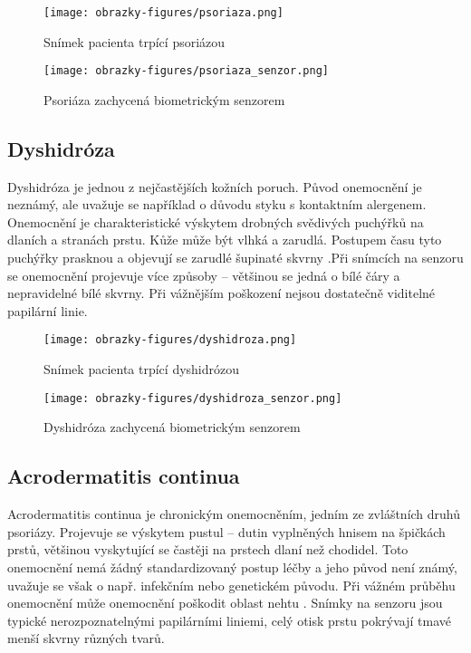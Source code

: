 \begin{figure}[!htbp]
  \begin{minipage}[b]{0.5\linewidth}
    \centering
    \texttt{[image: obrazky-figures/psoriaza.png]}
    \caption{Snímek pacienta trpící psoriázou~\cite{InfluenceSkinDiseases}}
  \end{minipage}
  \hspace{0.5cm}
  \begin{minipage}[b]{0.5\linewidth}
    \centering
    \texttt{[image: obrazky-figures/psoriaza\_senzor.png]}
    \caption{Psoriáza zachycená biometrickým senzorem \cite{Barotova}}
  \end{minipage}
\end{figure}
\subsection*{Dyshidróza}
Dyshidróza je jednou z nejčastějších kožních poruch. Původ onemocnění je neznámý, ale uvažuje se například o důvodu styku s kontaktním alergenem. Onemocnění je charakteristické výskytem drobných svědivých puchýřků na dlaních a stranách prstu. Kůže může být vlhká a zarudlá. Postupem času tyto puchýřky prasknou a objevují se zarudlé šupinaté skvrny \cite{InfluenceSkinDiseases}.Při snímcích na senzoru se onemocnění projevuje více způsoby -- většinou se jedná o bílé čáry a nepravidelné bílé skvrny. Při vážnějším poškození nejsou dostatečně viditelné papilární linie.

\begin{figure}[!htbp]
  \begin{minipage}[b]{0.5\linewidth}
    \centering
    \texttt{[image: obrazky-figures/dyshidroza.png]}
    \caption{Snímek pacienta trpící dyshidrózou \cite{InfluenceSkinDiseases}}
  \end{minipage}
  \hspace{0.5cm}
  \begin{minipage}[b]{0.5\linewidth}
    \centering
    \texttt{[image: obrazky-figures/dyshidroza\_senzor.png]}
    \caption{Dyshidróza zachycená biometrickým senzorem \cite{Barotova}}
  \end{minipage}
\end{figure}

\subsection*{Acrodermatitis continua}
Acrodermatitis continua je chronickým onemocněním, jedním ze zvláštních druhů psoriázy. Projevuje se výskytem pustul -- dutin vyplněných hnisem na špičkách prstů, většinou vyskytující se častěji na prstech dlaní než chodidel. Toto onemocnění nemá žádný standardizovaný postup léčby a jeho původ není známý, uvažuje se však o např. infekčním nebo genetickém původu. Při vážném průběhu onemocnění může onemocnění poškodit oblast nehtu \cite{AcrodermatitisContinua}. Snímky na senzoru jsou typické nerozpoznatelnými papilárními liniemi, celý otisk prstu pokrývají tmavé menší skvrny různých tvarů.

